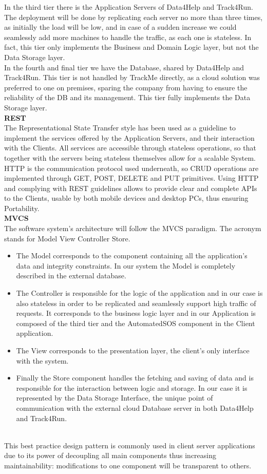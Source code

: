 \documentclass[titlepage]{article}
\begin{document}
In the third tier there is the Application Servers of Data4Help and Track4Run. The deployment will be done by replicating each server no more than three times, as initially the load will be low, and in case of a sudden increase we could seamlessly add more machines to handle the traffic, as each one is stateless. In fact, this tier only implements the Business and Domain Logic layer, but not the Data Storage layer. \\

In the fourth and final tier we have the Database, shared by Data4Help and Track4Run. This tier is not handled by TrackMe directly, as a cloud solution was preferred to one on premises, sparing the company from having to ensure the reliability of the DB and its management. 
This tier fully implements the Data Storage layer.\\

{\bf REST}\\
The Representational State Transfer style has been used as a guideline to implement the services offered by the Application Servers, and their interaction with the Clients. All services are accessible through stateless operations, so that together with the servers being stateless themselves allow for a scalable System.
HTTP is the communication protocol used underneath, so CRUD operations are implemented through GET, POST, DELETE and PUT primitives. 
Using HTTP and complying with REST guidelines allows to provide clear and complete APIs to the Clients, usable by both mobile devices and desktop PCs, thus ensuring Portability.\\

{\bf MVCS}\\
The software system’s architecture will follow the MVCS paradigm. The acronym stands for Model View Controller Store.
\begin{itemize}
        \item {} The Model corresponds to the component containing all the application’s data and integrity constraints. In our system the Model is completely described in the external database.
		\item {} The Controller is responsible for the logic of the application and in our case is also stateless in order to be replicated and seamlessly support high traffic of requests. It corresponds to the business logic layer and in our Application is composed of the third tier and the AutomatedSOS component in the Client application. 
		\item {} The View corresponds to the presentation layer, the client’s only interface with the system. 
		\item {} Finally the Store component handles the fetching and saving of data and is responsible for the interaction between logic and storage. In our case it is represented by the Data Storage Interface, the unique point of communication with the external cloud Database server in both Data4Help and Track4Run.
    \end{itemize} \\
This best practice design pattern is commonly used in client server applications due to its power of decoupling all main components thus increasing maintainability: modifications to one component will be transparent to others.
\pagebreak
\end{document}
